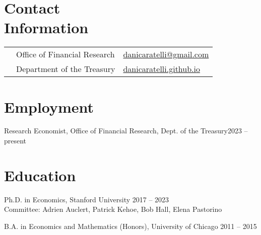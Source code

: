 \documentclass[margin,line]{res}                          %
\newenvironment{list1}{
	\begin{list}{\ding{113}}{%
			\setlength{\itemsep}{0in}
			\setlength{\parsep}{0in} \setlength{\parskip}{0in}
			\setlength{\topsep}{0in} \setlength{\partopsep}{0in}
			\setlength{\leftmargin}{0.17in}}}{\end{list}}
\begin{document}
	
	\begin{resume}
		\thispagestyle{plain} %
		
		\section{\sc Contact \\Information}
		\vspace{.05in}
		\begin{tabular}{@{}p{0.20in}p{2.75in}p{2.75in}}
			& Office of Financial Research      &\href{mailto:danicaratelli@gmail.com}{danicaratelli@gmail.com}
			\\    
			& Department of the Treasury  & \href{https://danicaratelli.github.io/}{danicaratelli.github.io}
		\end{tabular}
		
		\section{\sc Employment}
		\begin{list1}
			\item[] Research Economist, Office of Financial Research, Dept. of the Treasury\hfill 2023 -- present
		\end{list1}	
		
		\section{\sc Education}
		\begin{list1}
			\item[] Ph.D. in Economics, Stanford University \hfill 2017 -- 2023\\
			Committee: Adrien Auclert, Patrick Kehoe, Bob Hall, Elena Pastorino\smallskip
			\item[] B.A. in Economics and Mathematics (Honors), University of Chicago \hfill 2011 -- 2015
		\end{list1}
		

\end{resume}
\end{document}
